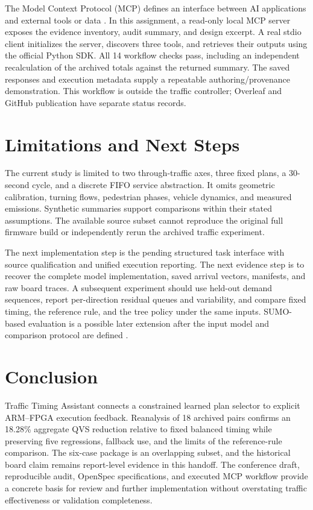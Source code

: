 \documentclass[conference]{IEEEtran}
\begin{document}
The Model Context Protocol (MCP) defines an interface between AI applications and external tools or data \cite{mcp}. In this assignment, a read-only local MCP server exposes the evidence inventory, audit summary, and design excerpt. A real stdio client initializes the server, discovers three tools, and retrieves their outputs using the official Python SDK. All 14 workflow checks pass, including an independent recalculation of the archived totals against the returned summary. The saved responses and execution metadata supply a repeatable authoring/provenance demonstration. This workflow is outside the traffic controller; Overleaf and GitHub publication have separate status records.

\section{Limitations and Next Steps}
The current study is limited to two through-traffic axes, three fixed plans, a 30-second cycle, and a discrete FIFO service abstraction. It omits geometric calibration, turning flows, pedestrian phases, vehicle dynamics, and measured emissions. Synthetic summaries support comparisons within their stated assumptions. The available source subset cannot reproduce the original full firmware build or independently rerun the archived traffic experiment.

The next implementation step is the pending structured task interface with source qualification and unified execution reporting. The next evidence step is to recover the complete model implementation, saved arrival vectors, manifests, and raw board traces. A subsequent experiment should use held-out demand sequences, report per-direction residual queues and variability, and compare fixed timing, the reference rule, and the tree policy under the same inputs. SUMO-based evaluation is a possible later extension after the input model and comparison protocol are defined \cite{lopez2018sumo}.

\section{Conclusion}
Traffic Timing Assistant connects a constrained learned plan selector to explicit ARM--FPGA execution feedback. Reanalysis of 18 archived pairs confirms an 18.28\% aggregate QVS reduction relative to fixed balanced timing while preserving five regressions, fallback use, and the limits of the reference-rule comparison. The six-case package is an overlapping subset, and the historical board claim remains report-level evidence in this handoff. The conference draft, reproducible audit, OpenSpec specifications, and executed MCP workflow provide a concrete basis for review and further implementation without overstating traffic effectiveness or validation completeness.



\end{document}

